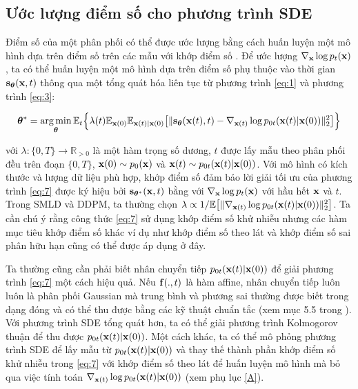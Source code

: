 \documentclass{article} %
\begin{document}
\subsection{Ước lượng điểm số cho phương trình SDE} \label{Estimating-Scores-For-The-SDE}

Điểm số của một phân phối có thể được ước lượng bằng cách huấn luyện một mô hình dựa trên điểm số trên các mẫu với khớp điểm số \citep{hyvarinen2005estimation,song2020sliced}. Để ước lượng $\nabla_{\bold{x}} \log p_t(\bold{x})$, ta có thể huấn luyện một mô hình dựa trên điểm số phụ thuộc vào thời gian $\bold{s}_{\boldsymbol{\theta}}(\bold{x}, t)$ thông qua một tổng quát hóa liên tục từ phương trình \ref{eq:1} và phương trình \ref{eq:3}:

\begin{equation} \label{eq:7}
    \boldsymbol{\theta}^{\ast} = \operatorname*{arg\,min}_{\boldsymbol{\theta}} \mathbb{E}_t \Big \lbrace  \lambda(t) \mathbb{E}_{\bold{x}(0)} \mathbb{E}_{\bold{x}(t) \vert \bold{x}(0)} \big \lbrack \lVert \bold{s}_{\boldsymbol{\theta}} (\bold{x}(t), t) - \nabla_{\bold{x}(t)} \log p_{0t} (\bold{x}(t) \vert \bold{x}(0)) \rVert_2^2 \big \rbrack \Big \rbrace
\end{equation}

với $\lambda: \lbrace 0, T \rbrace \rightarrow \mathbb{R}_{>0}$ là một hàm trọng số dương,
$t$ được lấy mẫu theo phân phối đều trên đoạn $\lbrace 0, T \rbrace$, $\bold{x}(0) \sim p_0 (\bold{x})$ và $\bold{x}(t) \sim p_{0t} (\bold{x}(t) \vert \bold{x}(0))$.
Với mô hình có kích thước và lượng dữ liệu phù hợp, khớp điểm số đảm bảo lời giải tối ưu của phương trình \ref{eq:7} được ký hiệu bởi $\bold{s}_{\boldsymbol{\theta}^{\ast}}(\bold{x}, t)$ bằng với $\nabla_{\bold{x}} \log p_t (\bold{x})$ với hầu hết $\bold{x}$ và $t$.
Trong SMLD và DDPM, ta thường chọn $\lambda \propto 1 / \mathbb{E} \big \lbrack \lVert \nabla_{\bold{x}(t)} \log p_{0t} (\bold{x}(t) \vert \bold{x}(0)) \rVert_2^2 \big \rbrack$.
Ta cần chú ý rằng công thức \ref{eq:7} sử dụng khớp điểm số khử nhiễu nhưng các hàm mục tiêu khớp điểm số khác ví dụ như khớp điểm số theo lát \citep{song2020sliced} và khớp điểm số sai phân hữu hạn \citep{pang2020efficient} cũng có thể được áp dụng ở đây.

Ta thường cũng cần phải biết nhân chuyển tiếp $p_{0t} (\bold{x}(t) \vert \bold{x}(0))$ để giải phương trình \ref{eq:7} một cách hiệu quả.
Nếu $\bold{f}(.,t)$ là hàm affine, nhân chuyển tiếp luôn luôn là phân phối Gaussian mà trung bình và phương sai thường được biết trong dạng đóng và có thể thu được bằng các kỹ thuật chuẩn tắc (xem mục 5.5  trong \citep{sarkka2019applied}).
Với phương trình SDE tổng quát hơn, ta có thể giải phương trình Kolmogorov thuận \citep{oksendal2003stochastic} để thu được $p_{0t} (\bold{x}(t) \vert \bold{x}(0))$.
Một cách khác, ta có thể mô phỏng phương trình SDE để lấy mẫu từ $p_{0t}(\bold{x}(t) \vert \bold{x}(0))$ và thay thế thành phần khớp điểm số khử nhiễu trong \ref{eq:7} với khớp điểm số theo lát để huấn luyện mô hình mà bỏ qua việc tính toán $\nabla_{\bold{x}(t)} \log p_{0t} (\bold{x}(t) \vert \bold{x}(0))$ (xem phụ lục \ref{A}).
\end{document}
